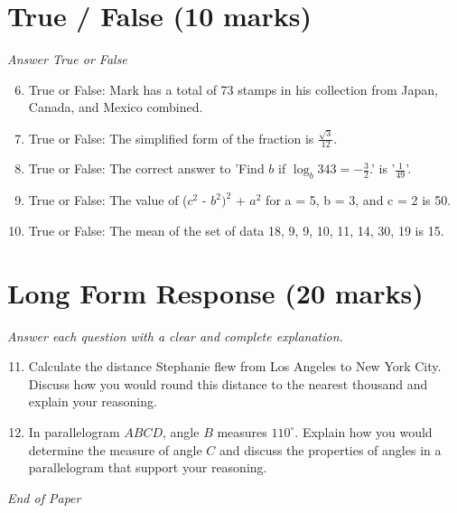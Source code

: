 \documentclass[12pt]{article}
\begin{document}
\section*{True / False (10 marks)}
\textit{Answer True or False}
\begin{enumerate}[label=\arabic*.]
\setcounter{enumi}{5}
\item True or False: Mark has a total of 73 stamps in his collection from Japan, Canada, and Mexico combined.
\item True or False: The simplified form of the fraction is \( \frac{\sqrt{3}}{12} \).
\item True or False: The correct answer to 'Find $b$ if $\log_{b}343=-\frac{3}{2}$.' is '\ensuremath{\frac{1}{49}}'.
\item True or False: The value of ($c^2$ - $b^2$$)^2$ + $a^2$ for a = 5, b = 3, and c = 2 is 50.
\item True or False: The mean of the set of data 18, 9, 9, 10, 11, 14, 30, 19 is 15.
\end{enumerate}

\section*{Long Form Response (20 marks)}
\textit{Answer each question with a clear and complete explanation.}
\begin{enumerate}[label=\arabic*.]
\setcounter{enumi}{10}
\item Calculate the distance Stephanie flew from Los Angeles to New York City. Discuss how you would round this distance to the nearest thousand and explain your reasoning.
\item In parallelogram $ABCD$, angle $B$ measures $110^\circ$. Explain how you would determine the measure of angle $C$ and discuss the properties of angles in a parallelogram that support your reasoning.
\end{enumerate}

\vfill
\noindent\textit{End of Paper}
\end{document}
